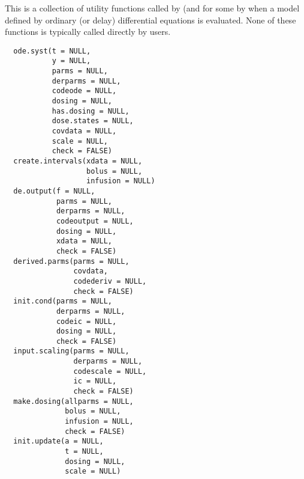 %
\begin{Description}\relax
This is a collection of utility functions called by  (and for 
some by  when a model defined by ordinary (or delay)
differential equations is evaluated. None of these functions is typically 
called directly by users.
\end{Description}
%
\begin{Usage}
\begin{verbatim}
  ode.syst(t = NULL,
           y = NULL,
           parms = NULL,
           derparms = NULL,
           codeode = NULL,
           dosing = NULL,
           has.dosing = NULL,
           dose.states = NULL,
           covdata = NULL,
           scale = NULL,
           check = FALSE)
  create.intervals(xdata = NULL,
                   bolus = NULL,
                   infusion = NULL)
  de.output(f = NULL,
            parms = NULL,
            derparms = NULL,
            codeoutput = NULL,
            dosing = NULL,
            xdata = NULL,
            check = FALSE)
  derived.parms(parms = NULL,
                covdata,
                codederiv = NULL,
                check = FALSE)
  init.cond(parms = NULL,
            derparms = NULL,
            codeic = NULL,
            dosing = NULL,
            check = FALSE)
  input.scaling(parms = NULL,
                derparms = NULL,
                codescale = NULL,
                ic = NULL,
                check = FALSE)
  make.dosing(allparms = NULL,
              bolus = NULL,
              infusion = NULL,
              check = FALSE)
  init.update(a = NULL,
              t = NULL,
              dosing = NULL,
              scale = NULL)
\end{verbatim}
\end{Usage}
%
